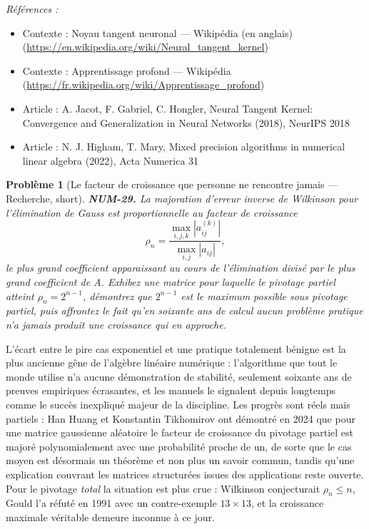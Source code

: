 \documentclass[11pt]{article}
\newtheorem{problem}{Problème}
\newenvironment{refs}{\par\small\noindent\emph{Références :}\begin{itemize}\setlength\itemsep{0pt}}{\end{itemize}\normalsize}
\begin{document}
\begin{refs}
\item Contexte : Noyau tangent neuronal --- Wikipédia (en anglais) (\url{https://en.wikipedia.org/wiki/Neural_tangent_kernel})
\item Contexte : Apprentissage profond --- Wikipédia (\url{https://fr.wikipedia.org/wiki/Apprentissage_profond})
\item Article : A. Jacot, F. Gabriel, C. Hongler, \og{} Neural Tangent Kernel: Convergence and Generalization in Neural Networks \fg{} (2018), NeurIPS 2018
\item Article : N. J. Higham, T. Mary, \og{} Mixed precision algorithms in numerical linear algebra \fg{} (2022), Acta Numerica 31
\end{refs}

\bigskip

\begin{problem}[{Le facteur de croissance que personne ne rencontre jamais --- Recherche, short}]
\textbf{NUM-29.} La majoration d'erreur inverse de Wilkinson pour l'élimination de Gauss est proportionnelle au facteur de croissance
\[ \rho_n = \frac{\max_{i,j,k} |a^{(k)}_{ij}|}{\max_{i,j} |a_{ij}|}, \]
le plus grand coefficient apparaissant au cours de l'élimination divisé par le plus grand coefficient de $A$. Exhibez une matrice pour laquelle le pivotage partiel atteint $\rho_n = 2^{n-1}$, démontrez que $2^{n-1}$ est le maximum possible sous pivotage partiel, puis affrontez le fait qu'en soixante ans de calcul aucun problème pratique n'a jamais produit une croissance qui en approche.
\end{problem}

\noindent L'écart entre le pire cas exponentiel et une pratique totalement bénigne est la plus ancienne gêne de l'algèbre linéaire numérique : l'algorithme que tout le monde utilise n'a aucune démonstration de stabilité, seulement soixante ans de preuves empiriques écrasantes, et les manuels le signalent depuis longtemps comme le succès inexpliqué majeur de la discipline. Les progrès sont réels mais partiels : Han Huang et Konstantin Tikhomirov ont démontré en 2024 que pour une matrice gaussienne aléatoire le facteur de croissance du pivotage partiel est majoré polynomialement avec une probabilité proche de un, de sorte que le cas moyen est désormais un théorème et non plus un savoir commun, tandis qu'une explication couvrant les matrices structurées issues des applications reste ouverte. Pour le pivotage \textit{total} la situation est plus crue : Wilkinson conjecturait $\rho_n \le n$, Gould l'a réfuté en 1991 avec un contre-exemple $13 \times 13$, et la croissance maximale véritable demeure inconnue à ce jour.
\end{document}
